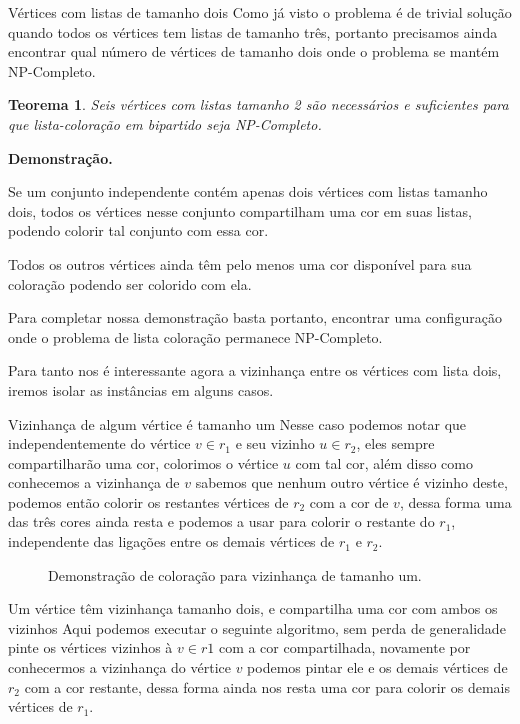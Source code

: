 \documentclass[9pt, compress]{beamer}
\newtheorem{teorema}{Teorema}
\begin{document}
     \begin{frame}{Vértices com listas de tamanho dois}
       Como já visto o problema é de trivial solução quando todos os vértices tem listas de tamanho três, portanto precisamos ainda encontrar qual número de vértices de tamanho dois onde o problema se mantém NP-Completo.
       \begin{teorema}
         Seis vértices com listas tamanho 2 são necessários e suficientes para que lista-coloração em bipartido seja NP-Completo.
       \end{teorema}
       \textbf{Demonstração.}
       
 
       Se um conjunto independente contém apenas dois vértices com listas tamanho dois, todos os vértices nesse conjunto compartilham uma cor em suas listas, podendo colorir tal conjunto com essa cor.
       
        Todos os outros vértices ainda têm pelo menos uma cor disponível para sua coloração podendo ser colorido com ela. 
       
       Para completar nossa demonstração basta portanto, encontrar uma configuração onde o problema de lista coloração permanece NP-Completo.
 
       Para tanto nos é interessante agora a vizinhança entre os vértices com lista dois, iremos isolar as instâncias em alguns casos.  
       
     \end{frame}
     \begin{frame}{Vizinhança de algum vértice é tamanho um}
        Nesse caso podemos notar que independentemente do vértice $v \in r_1$ e seu vizinho $u \in r_2$, eles sempre compartilharão uma cor, colorimos o vértice $u$ com tal cor, além disso como conhecemos a vizinhança de $v$ sabemos que nenhum outro vértice é vizinho deste, podemos então colorir os restantes vértices de $r_2$ com a cor de $v$, dessa forma uma das três cores ainda resta e podemos a usar para colorir o restante do $r_1$, independente das ligações entre os demais vértices de $r_1$ e $r_2$.
     \end{frame}
     \begin{frame}
       \begin{figure}[H]
         \centering
         \fontsize{4}{10}
         
         \caption{Demonstração de coloração para vizinhança de tamanho um.}
       \end{figure}
     \end{frame}
     \begin{frame}{Um vértice têm vizinhança tamanho dois, e compartilha uma cor com ambos os vizinhos}
       Aqui podemos executar o seguinte algoritmo, sem perda de generalidade pinte os vértices vizinhos à $v \in r1$ com a cor compartilhada, novamente por conhecermos a vizinhança do vértice $v$ podemos pintar ele e os demais vértices de $r_2$ com a cor restante, dessa forma ainda nos resta uma cor para colorir os demais vértices de $r_1$.
     \end{frame}
\end{document}
